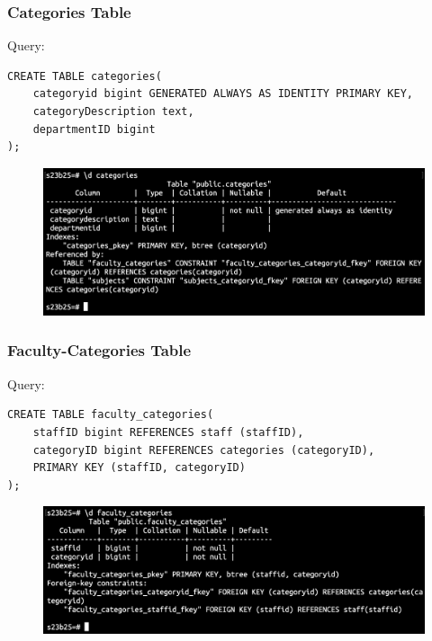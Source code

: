 \documentclass{article}
\begin{document}
\subsubsection*{Categories Table}
Query:
\begin{Verbatim}[frame=single,framerule=1pt,fontfamily=courier,fontsize=\small]
CREATE TABLE categories(
    categoryid bigint GENERATED ALWAYS AS IDENTITY PRIMARY KEY,
    categoryDescription text,
    departmentID bigint
);
\end{Verbatim}
\begin{figure}[h]
    \centering
    \includegraphics[width=\textwidth]{./o_3_categories.png}
\end{figure}

\subsubsection*{Faculty-Categories Table}
Query:
\begin{Verbatim}[frame=single,framerule=1pt,fontfamily=courier,fontsize=\small]
CREATE TABLE faculty_categories(
    staffID bigint REFERENCES staff (staffID),
    categoryID bigint REFERENCES categories (categoryID),
    PRIMARY KEY (staffID, categoryID)
);
\end{Verbatim}
\begin{figure}[h]
    \centering
    \includegraphics[width=\textwidth]{./o_4_faculty_categories.png}
\end{figure}
\end{document}
